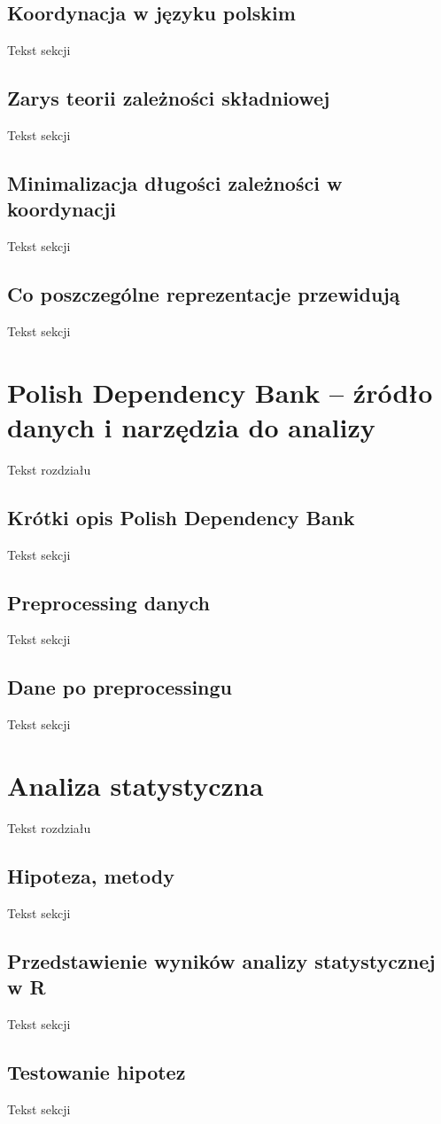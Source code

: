 \documentclass[licencjacka]{pracamgr}
\begin{document}
\section{Koordynacja w języku polskim}
Tekst sekcji
\section{Zarys teorii zależności składniowej}
Tekst sekcji
\section{Minimalizacja długości zależności w koordynacji}
Tekst sekcji
\section{Co poszczególne reprezentacje przewidują}
Tekst sekcji

\chapter{Polish Dependency Bank -- źródło danych i narzędzia do analizy}
Tekst rozdziału
\section{Krótki opis Polish Dependency Bank}
Tekst sekcji
\section{Preprocessing danych}
Tekst sekcji
\section{Dane po preprocessingu}
Tekst sekcji

\chapter{Analiza statystyczna}
Tekst rozdziału
\section{Hipoteza, metody}
Tekst sekcji
\section{Przedstawienie wyników analizy statystycznej w R}
Tekst sekcji
\section{Testowanie hipotez}
Tekst sekcji
\end{document}
